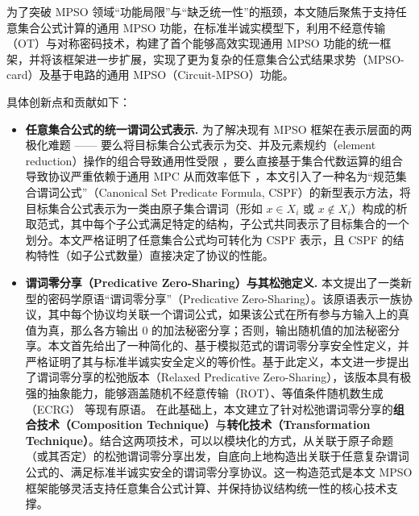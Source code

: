 为了突破 MPSO 领域“功能局限”与“缺乏统一性”的瓶颈，本文随后聚焦于支持任意集合公式计算的通用 MPSO 功能，在标准半诚实模型下，利用不经意传输（OT）与对称密码技术，构建了首个能够高效实现通用 MPSO 功能的统一框架，并将该框架进一步扩展，实现了更为复杂的任意集合公式结果求势（MPSO-card）及基于电路的通用 MPSO（Circuit-MPSO）功能。

具体创新点和贡献如下：

\begin{itemize}
    \item \textbf{任意集合公式的统一谓词公式表示.} 
    为了解决现有 MPSO 框架在表示层面的两极化难题 —— 要么将目标集合公式表示为交、并及元素规约（element reduction）操作的组合导致通用性受限 \cite{KS-CRYPTO-2005}，要么直接基于集合代数运算的组合导致协议严重依赖于通用 MPC 从而效率低下 \cite{BA-ASIACCS-2012}，本文引入了一种名为“规范集合谓词公式”（Canonical Set Predicate Formula, CSPF）的新型表示方法，将目标集合公式表示为一类由原子集合谓词（形如 $x \in X_i$ 或 $x \notin X_i$）构成的析取范式，其中每个子公式满足特定的结构，子公式共同表示了目标集合的一个划分。本文严格证明了任意集合公式均可转化为 CSPF 表示，且 CSPF 的结构特性（如子公式数量）直接决定了协议的性能。

    \item \textbf{谓词零分享（Predicative Zero-Sharing）与其松弛定义.} 本文提出了一类新型的密码学原语“谓词零分享”（Predicative Zero-Sharing）。该原语表示一族协议，其中每个协议均关联一个谓词公式，如果该公式在所有参与方输入上的真值为真，那么各方输出 0 的加法秘密分享；否则，输出随机值的加法秘密分享。本文首先给出了一种简化的、基于模拟范式的谓词零分享安全性定义，并严格证明了其与标准半诚实安全定义的等价性。基于此定义，本文进一步提出了谓词零分享的松弛版本（Relaxed Predicative Zero-Sharing），该版本具有极强的抽象能力，能够涵盖随机不经意传输（ROT）、等值条件随机数生成（ECRG）\cite{Jia0ZG24} 等现有原语。
    在此基础上，本文建立了针对松弛谓词零分享的\textbf{组合技术（Composition Technique）}与\textbf{转化技术（Transformation Technique）}。结合这两项技术，可以以模块化的方式，从关联于原子命题（或其否定）的松弛谓词零分享出发，自底向上地构造出关联于任意复杂谓词公式的、满足标准半诚实安全的谓词零分享协议。这一构造范式是本文 MPSO 框架能够灵活支持任意集合公式计算、并保持协议结构统一性的核心技术支撑。


\end{itemize}
